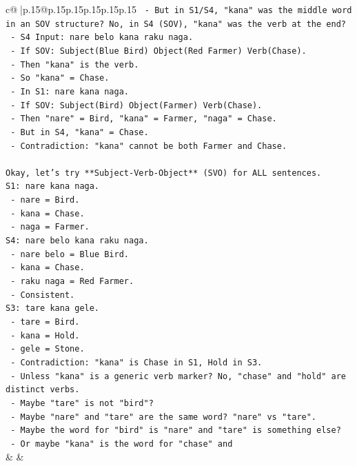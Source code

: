 \documentclass{article}
\begin{document}
{\begin{supertabular}{c@{$\;$}|p{.15\linewidth}@{}p{.15\linewidth}p{.15\linewidth}p{.15\linewidth}p{.15\linewidth}p{.15\linewidth}}
{{{\texttt{      {-} But in S1/S4, "kana" was the middle word in an SOV structure? No, in S4 (SOV), "kana" was the verb at the end?} \\
\texttt{        {-} S4 Input: nare belo kana raku naga.} \\
\texttt{        {-} If SOV: Subject(Blue Bird) Object(Red Farmer) Verb(Chase).} \\
\texttt{        {-} Then "kana" is the verb.} \\
\texttt{        {-} So "kana" = Chase.} \\
\texttt{      {-} In S1: nare kana naga.} \\
\texttt{        {-} If SOV: Subject(Bird) Object(Farmer) Verb(Chase).} \\
\texttt{        {-} Then "nare" = Bird, "kana" = Farmer, "naga" = Chase.} \\
\texttt{        {-} But in S4, "kana" = Chase.} \\
\texttt{        {-} Contradiction: "kana" cannot be both Farmer and Chase.} \\
\\ 
\texttt{Okay, let's try **Subject{-}Verb{-}Object** (SVO) for ALL sentences.} \\
\texttt{S1: nare kana naga.} \\
\texttt{  {-} nare = Bird.} \\
\texttt{  {-} kana = Chase.} \\
\texttt{  {-} naga = Farmer.} \\
\texttt{S4: nare belo kana raku naga.} \\
\texttt{  {-} nare belo = Blue Bird.} \\
\texttt{  {-} kana = Chase.} \\
\texttt{  {-} raku naga = Red Farmer.} \\
\texttt{  {-} Consistent.} \\
\texttt{S3: tare kana gele.} \\
\texttt{  {-} tare = Bird.} \\
\texttt{  {-} kana = Hold.} \\
\texttt{  {-} gele = Stone.} \\
\texttt{  {-} Contradiction: "kana" is Chase in S1, Hold in S3.} \\
\texttt{  {-} Unless "kana" is a generic verb marker? No, "chase" and "hold" are distinct verbs.} \\
\texttt{  {-} Maybe "tare" is not "bird"?} \\
\texttt{  {-} Maybe "nare" and "tare" are the same word? "nare" vs "tare".} \\
\texttt{  {-} Maybe the word for "bird" is "nare" and "tare" is something else?} \\
\texttt{  {-} Or maybe "kana" is the word for "chase" and} \\
            }
        }
    }
    & & \\ \\


\end{supertabular}}
\end{document}

